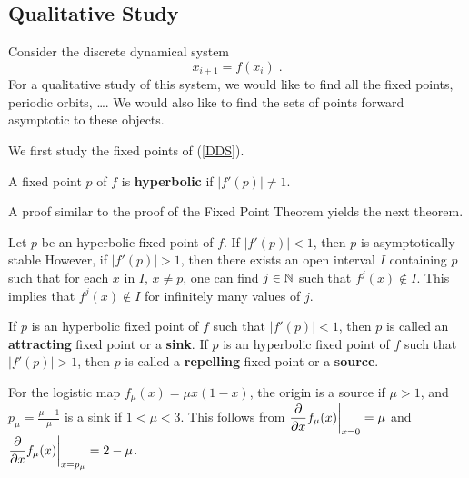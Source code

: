 \subsection{Qualitative Study}

Consider the discrete dynamical system
\begin{equation} \label{DDS}
x_{i+1} = f(x_i) \; .
\end{equation}
For a qualitative study of this system, we would like to find all the
fixed points, periodic orbits, \ldots.  We would also like to find the
sets of points forward asymptotic to these objects.

We first study the fixed points of (\ref{DDS}).

\begin{defn}
A fixed point $p$ of $f$ is
{\bfseries hyperbolic} if
$\left|f'(p)\right| \neq 1$.
\end{defn}

A proof similar to the proof of the Fixed Point Theorem yields the next
theorem.

\begin{prop}
Let $p$ be an hyperbolic fixed point of $f$.  If
$\left|f'(p)\right|<1$, then $p$ is asymptotically stable
However, if $\left|f'(p)\right|>1$, then there exists an open
interval $I$ containing $p$ such that for each $x$ in $I$,
$x \neq p$, one can find $j \in \NN$ such that $f^j(x) \not\in I$.
This implies that $f^j(x) \not\in I$ for infinitely many values of $j$.
\label{fp_stability}
\end{prop}

\begin{defn}
If $p$ is an hyperbolic fixed point of $f$ such that
$\left|f'(p)\right|<1$, then $p$ is called an
{\bfseries attracting} fixed point or a
{\bfseries sink}.
If $p$ is an hyperbolic fixed point of $f$ such that
$\left|f'(p)\right|>1$, then $p$ is called a
{\bfseries repelling} fixed point or a
{\bfseries source}.
\end{defn}

\begin{egg}
For the logistic map $f_\mu(x) = \mu x(1-x)$, the origin is a source
if $\mu>1$, and $\displaystyle p_\mu  = \frac{\mu-1}{\mu}$ is a sink
if $1<\mu<3$.  This follows from
$\displaystyle \pdfdx{f_\mu(x)}{x}\bigg|_{x=0} = \mu$ and
$\displaystyle \pdfdx{f_\mu(x)}{x}\bigg|_{x=p_\mu} = 2-\mu$.
\label{EggLogMap2}
\end{egg}

